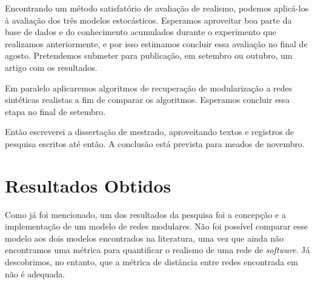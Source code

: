 \documentclass[12pt]{article}
\begin{document}
Encontrando um método satisfatório de avaliação de realismo, podemos aplicá-los
à avaliação dos três modelos estocásticos. Esperamos aproveitar boa parte da
base de dados e do conhecimento acumulados durante o experimento que realizamos
anteriormente, e por isso estimamos concluir essa avaliação no final de agosto.
Pretendemos submeter para publicação, em setembro ou outubro, um artigo com os
resultados.

Em paralelo aplicaremos algoritmos de recuperação de modularização a redes
sintéticas realistas a fim de comparar os algoritmos. Esperamos concluir essa
etapa no final de setembro.

Então escreverei a dissertação de mestrado, aproveitando textos e registros de
pesquisa escritos até então. A conclusão está prevista para meados de novembro.

%

\section{Resultados Obtidos}

Como já foi mencionado, um dos resultados da pesquisa foi a concepção e a
implementação de um modelo de redes modulares. Não foi possível comparar esse
modelo aos dois modelos encontrados na literatura, uma vez que ainda não
encontramos uma métrica para quantificar o realismo de uma rede de
\emph{software}. Já descobrimos, no entanto, que a métrica de distância entre
redes encontrada em \cite{Andrade2008} não é adequada.
\end{document}
